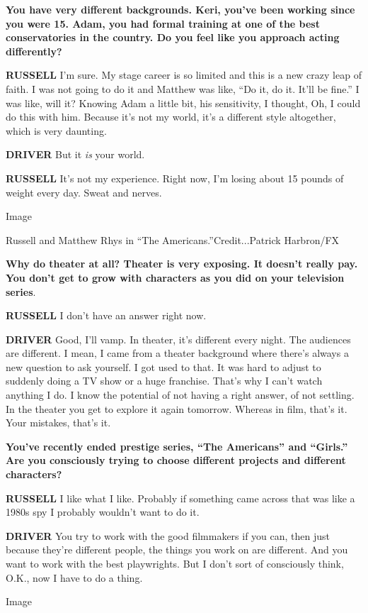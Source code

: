 \textbf{You have very different backgrounds. Keri, you've been working
since you were 15. Adam, you had formal training at one of the best
conservatories in the country. Do you feel like you approach acting
differently?}

\textbf{RUSSELL} I'm sure. My stage career is so limited and this is a
new crazy leap of faith. I was not going to do it and Matthew was like,
``Do it, do it. It'll be fine.'' I was like, will it? Knowing Adam a
little bit, his sensitivity, I thought, Oh, I could do this with him.
Because it's not my world, it's a different style altogether, which is
very daunting.

\textbf{DRIVER} But it \emph{is} your world.

\textbf{RUSSELL} It's not my experience. Right now, I'm losing about 15
pounds of weight every day. Sweat and nerves.

Image

Russell and Matthew Rhys in ``The Americans.''Credit...Patrick
Harbron/FX

\textbf{Why do theater at all? Theater is very exposing. It doesn't
really pay. You don't get to grow with characters as you did on your
television series}.

\textbf{RUSSELL} I don't have an answer right now.

\textbf{DRIVER} Good, I'll vamp. In theater, it's different every night.
The audiences are different. I mean, I came from a theater background
where there's always a new question to ask yourself. I got used to that.
It was hard to adjust to suddenly doing a TV show or a huge franchise.
That's why I can't watch anything I do. I know the potential of not
having a right answer, of not settling. In the theater you get to
explore it again tomorrow. Whereas in film, that's it. Your mistakes,
that's it.

\textbf{You've recently ended prestige series, ``The Americans'' and
``Girls.'' Are you consciously trying to choose different projects and
different characters?}

\textbf{RUSSELL} I like what I like. Probably if something came across
that was like a 1980s spy I probably wouldn't want to do it.

\textbf{DRIVER} You try to work with the good filmmakers if you can,
then just because they're different people, the things you work on are
different. And you want to work with the best playwrights. But I don't
sort of consciously think, O.K., now I have to do a thing.

Image

